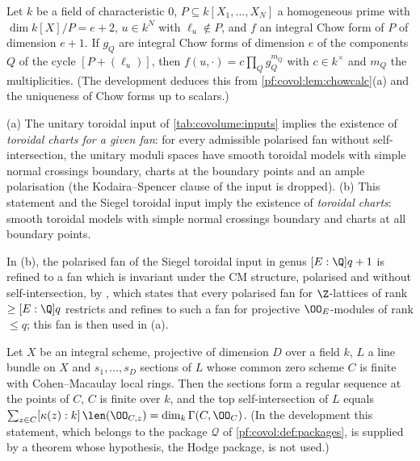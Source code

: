 \begin{littheorem}\label{pf:covol:lit:cut}
Let $k$ be a field of characteristic $0$, $P\subseteq k[X_1,\dots,X_N]$ a homogeneous prime with
$\dim k[X]/P=e+2$, $u\in k^N$ with $\ell_u\notin P$, and $f$ an integral Chow form of $P$ of dimension
$e+1$. If $g_Q$ are integral Chow forms of dimension $e$ of the components $Q$ of the cycle
$[P+(\ell_u)]$, then $f(u,\cdot)=c\prod_Qg_Q^{m_Q}$ with $c\in k^\times$ and $m_Q$ the multiplicities.
(The development deduces this from \cref{pf:covol:lem:chowcalc}(a) and the uniqueness of Chow forms up
to scalars.)
\end{littheorem}

\begin{littheorem}\label{pf:covol:lit:tor}
(a) The unitary toroidal input of \cref{tab:covolume:inputs} implies the existence of \emph{toroidal charts
for a given fan}: for every admissible polarised fan without self-intersection, the unitary moduli spaces
have smooth toroidal models with simple normal crossings boundary, charts at the boundary points and an
ample polarisation (the Kodaira--Spencer clause of the input is dropped). (b) This statement and the
Siegel toroidal input imply the existence of \emph{toroidal charts}: smooth toroidal models with simple
normal crossings boundary and charts at all boundary points.
\end{littheorem}

In (b), the polarised fan of the Siegel toroidal input in genus $[E:\Q]q+1$ is refined to a fan which is
invariant under the CM structure, polarised and without self-intersection, by
, which states that every polarised fan for
$\Z$-lattices of rank $\ge[E:\Q]q$ restricts and refines to such a fan for projective $\OO_E$-modules of
rank $\le q$; this fan is then used in (a).

\begin{littheorem}\label{pf:covol:lit:length}
Let $X$ be an integral scheme, projective of dimension $D$ over a field $k$, $L$ a line bundle on $X$ and
$s_1,\dots,s_D$ sections of $L$ whose common zero scheme $C$ is finite with Cohen--Macaulay local rings.
Then the sections form a regular sequence at the points of $C$, $C$ is finite over $k$, and the top
self-intersection of $L$ equals $\sum_{z\in C}[\kappa(z):k]\,\len(\OO_{C,z})=\dim_k\Gamma(C,\OO_C)$.
(In the development this statement, which belongs to the package $\mathcal Q$ of
\cref{pf:covol:def:packages}, is supplied by a theorem whose hypothesis, the Hodge package, is not used.)
\end{littheorem}

